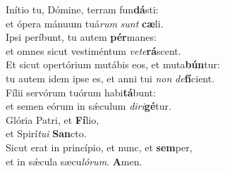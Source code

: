 \evenverse Inítio tu, Dómine, terram fun\textbf{dá}sti:~\*\\
\evenverse et ópera mánuum tuá\textit{rum} \textit{sunt} \textbf{cæ}li.\\
\oddverse Ipsi períbunt, tu autem \textbf{pér}manes:~\*\\
\oddverse et omnes sicut vestiméntum \textit{ve}\textit{te}\textbf{rá}scent.\\
\evenverse Et sicut opertórium mutábis eos, et muta\textbf{bún}tur:~\*\\
\evenverse tu autem idem ipse es, et anni tui \textit{non} \textit{de}\textbf{fí}cient.\\
\oddverse Fílii servórum tuórum habi\textbf{tá}bunt:~\*\\
\oddverse et semen eórum in sǽculum \textit{di}\textit{ri}\textbf{gé}tur.\\
\evenverse Glória Patri, et \textbf{Fí}lio,~\*\\
\evenverse et Spirí\textit{tu}\textit{i} \textbf{San}cto.\\
\oddverse Sicut erat in princípio, et nunc, et \textbf{sem}per,~\*\\
\oddverse et in sǽcula sæcu\textit{ló}\textit{rum}. \textbf{A}men.\\
